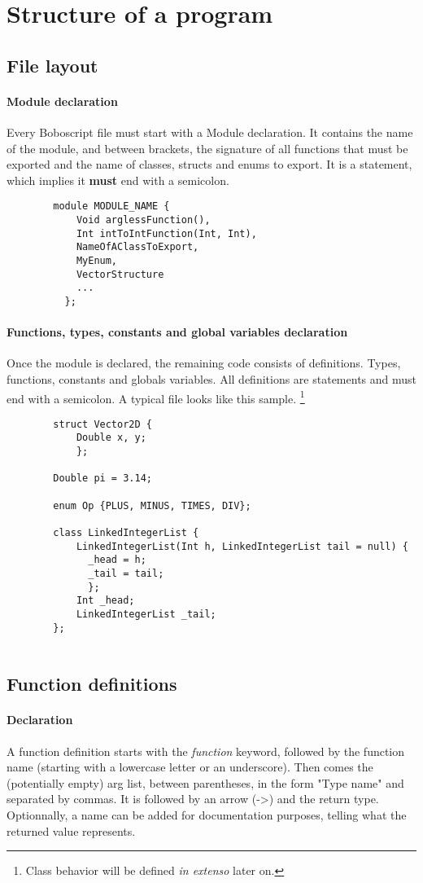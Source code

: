 \documentclass[a4paper, 12pt]{article}
\begin{document}
	\newpage
	\section{Structure of a program}
	\subsection{File layout}
	\paragraph{Module declaration}
	Every Boboscript file must start with a Module declaration. It contains the name of the module, and between brackets, the signature of all functions that must be exported and the name of classes, structs and enums to export. It is a statement, which implies it \textbf{must} end with a semicolon.
	\begin{verbatim}
		module MODULE_NAME {
		    Void arglessFunction(),
		    Int intToIntFunction(Int, Int),
		    NameOfAClassToExport,
		    MyEnum,
		    VectorStructure
		    ...
		  };
	\end{verbatim}
	\paragraph{Functions, types, constants and global variables declaration}
	Once the module is declared, the remaining code consists of definitions. Types, functions, constants and globals variables. All definitions are statements and must end with a semicolon.
	A typical file looks like this sample. \footnote{Class behavior will be defined \textit{in extenso} later on.}
	\begin{verbatim}
		struct Vector2D {
		    Double x, y;
		    };
		    
		Double pi = 3.14;
		
		enum Op {PLUS, MINUS, TIMES, DIV};
		
		class LinkedIntegerList {
		    LinkedIntegerList(Int h, LinkedIntegerList tail = null) {
		      _head = h;
		      _tail = tail;
		      };
		    Int _head;
		    LinkedIntegerList _tail;
		};
		
	\end{verbatim}
	
	\subsection{Function definitions}
	\paragraph{Declaration}
	A function definition starts with the \textit{function} keyword, followed by the function name (starting with a lowercase letter or an underscore). Then comes the (potentially empty) arg list, between parentheses, in the form "Type name" and separated by commas. It is followed by an arrow (->) and the return type. Optionnally, a name can be added for documentation purposes, telling what the returned value represents.
	
\end{document}
